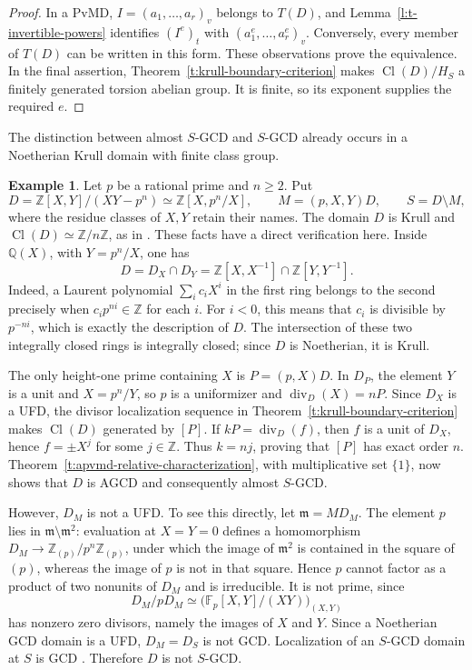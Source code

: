 \documentclass[11pt]{amsart}
\theoremstyle{definition}
\newtheorem{example}[theorem]{Example}
\theoremstyle{remark}
\DeclareMathOperator{\Cl}{Cl}
\newcommand{\ZZ}{\mathbb Z}
\newcommand{\QQ}{\mathbb Q}
\begin{document}
\begin{proof}
In a PvMD, $I=(a_1,\ldots,a_r)_v$ belongs to $T(D)$, and
Lemma~\ref{l:t-invertible-powers} identifies $(I^e)_t$ with
$(a_1^e,\ldots,a_r^e)_v$. Conversely, every member of $T(D)$
can be written in this form. These observations
prove the equivalence. In the final assertion,
Theorem~\ref{t:krull-boundary-criterion} makes
$\Cl(D)/H_S$ a finitely generated torsion abelian group.
It is finite, so its exponent supplies the required $e$.
\end{proof}

The distinction between almost $S$-GCD and $S$-GCD already
occurs in a Noetherian Krull domain with finite class group.

\begin{example}\label{e1}
Let $p$ be a rational prime and $n\geq2$. Put
\[
 D=\ZZ[X,Y]/(XY-p^n)\simeq\ZZ[X,p^n/X],
 \qquad M=(p,X,Y)D,
 \qquad S=D\setminus M,
\]
where the residue classes of $X,Y$ retain their names.
The domain $D$ is Krull and $\Cl(D)\simeq\ZZ/n\ZZ$, as in
\cite{AA2}. These facts have a direct verification here.
Inside $\QQ(X)$, with $Y=p^n/X$, one has
\[
 D=D_X\cap D_Y
   =\ZZ[X,X^{-1}]\cap\ZZ[Y,Y^{-1}].
\]
Indeed, a Laurent polynomial $\sum_i c_iX^i$ in the first ring
belongs to the second precisely when $c_i p^{ni}\in\ZZ$ for
each $i$. For $i<0$, this means that $c_i$ is divisible by
$p^{-ni}$, which is exactly the description of $D$.
The intersection of these two integrally closed rings is
integrally closed; since $D$ is Noetherian, it is Krull.

The only height-one prime containing $X$ is $P=(p,X)D$.
In $D_P$, the element $Y$ is a unit and $X=p^n/Y$, so $p$
is a uniformizer and $\operatorname{div}_D(X)=nP$.
Since $D_X$ is a UFD, the divisor localization sequence in
Theorem~\ref{t:krull-boundary-criterion} makes $\Cl(D)$
generated by $[P]$. If $kP=\operatorname{div}_D(f)$, then $f$
is a unit of $D_X$, hence $f=\pm X^j$ for some $j\in\ZZ$.
Thus $k=nj$, proving that $[P]$ has exact order $n$.
Theorem~\ref{t:apvmd-relative-characterization}, with
multiplicative set $\{1\}$, now shows that $D$ is AGCD and
consequently almost $S$-GCD.

However, $D_M$ is not a UFD. To see this directly, let
$\mathfrak m=MD_M$. The element $p$ lies in
$\mathfrak m\setminus\mathfrak m^2$: evaluation at $X=Y=0$
defines a homomorphism
$D_M\to\ZZ_{(p)}/p^n\ZZ_{(p)}$, under which the image of
$\mathfrak m^2$ is contained in the square of $(p)$, whereas
the image of $p$ is not in that square. Hence $p$ cannot
factor as a product of two nonunits of $D_M$ and is irreducible.
It is not prime, since
\[
 D_M/pD_M\simeq
 \bigl(\mathbb F_p[X,Y]/(XY)\bigr)_{(X,Y)}
\]
has nonzero zero divisors, namely the images of $X$ and $Y$.
Since a Noetherian GCD domain is a UFD, $D_M=D_S$ is not GCD.
Localization of an $S$-GCD domain at $S$ is GCD
\cite[Theorem~2.2]{AHZ}. Therefore $D$ is not $S$-GCD.
\end{example}
\end{document}
